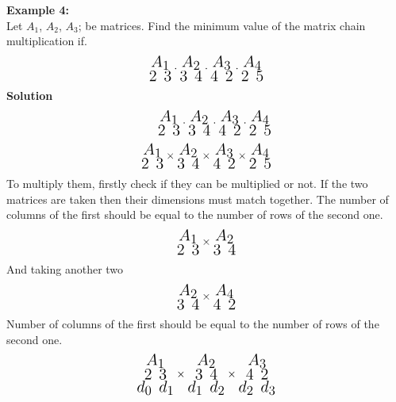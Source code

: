 \documentclass[12pt]{report}
\begin{document}
	\textbf{Example 4:}\\
	Let $A_1$, $A_2$, $A_3$; be matrices. Find the minimum value of the matrix chain multiplication if.
	\begin{align}
		\huge\substack{A_1\\ {2 ~3}} \cdot \substack{A_2\\ {3 ~4}} \cdot \substack{A_3\\ {4 ~2}}\cdot \substack{A_4\\ {2 ~5}}
	\end{align}
	\textbf{Solution}
	\begin{align*}
		\huge\substack{A_1\\ {2 ~3}} \cdot \substack{A_2\\ {3 ~4}} \cdot \substack{A_3\\ {4 ~2}}\cdot \substack{A_4\\ {2 ~5}}\\
		\huge\substack{A_1\\ {2 ~3}} \times \substack{A_2\\ {3 ~4}} \times \substack{A_3\\ {4 ~2}}\times \substack{A_4\\ {2 ~5}}
	\end{align*}
	To multiply them, firstly check if they can be multiplied or not. If the two matrices are taken then their dimensions must match together. The number of columns of the first should be equal to the number of rows of the second one.
	\begin{align*}
		\huge\substack{A_1\\ {2 ~3}} \times \substack{A_2\\ {3 ~4}}
	\end{align*}
	And taking another two
	\begin{align*}
		\huge\substack{A_2\\ {3 ~4}}\times \substack{A_4\\ {4 ~2}}
	\end{align*}
	Number of columns of the first should be equal to the number of rows of the second one.
	\begin{align*}
		\huge\substack{A_1\\ {2 ~3}\\d_0 ~d_1} \times \substack{A_2\\ {3 ~4}\\d_1 ~d_2} \times \substack{A_3\\ {4 ~2}\\d_2 ~d_3}
	\end{align*}
\end{document}
